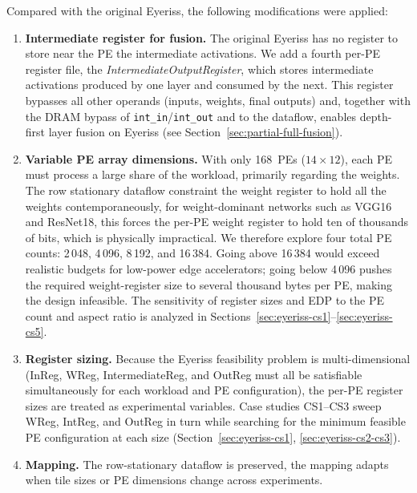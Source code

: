 Compared with the original Eyeriss, the following modifications were
applied:

\begin{enumerate}
  \item \textbf{Intermediate register for fusion.}
        The original Eyeriss has no register to store near the PE
        the intermediate activations.
        We add a fourth per-PE register file, the
        \emph{IntermediateOutputRegister}, which stores intermediate
        activations produced by one layer and consumed by the next.
        This register bypasses all other operands (inputs, weights,
        final outputs) and, together with the DRAM bypass of
        \texttt{int\_in}/\texttt{int\_out} and to the dataflow, enables depth-first
        layer fusion on Eyeriss
        (see Section~\ref{sec:partial-full-fusion}).

  \item \textbf{Variable PE array dimensions.}
        With only 168~PEs ($14 \times 12$), each PE must process a
        large share of the workload, primarily regarding the weights.
        The row stationary dataflow constraint the weight register to hold
        all the weights contemporaneously, for weight-dominant networks such
        as VGG16 and ResNet18, this forces the per-PE weight register to hold
        ten of thousands of bits, which is physically impractical.
        We therefore explore four total PE counts:
        2\,048, 4\,096, 8\,192, and 16\,384.
        Going above 16\,384 would exceed realistic budgets for
        low-power edge accelerators; going below 4\,096 pushes the
        required weight-register size to several thousand bytes per PE,
        making the design infeasible.
        The sensitivity of register sizes and EDP to the PE count and
        aspect ratio is analyzed in
        Sections~\ref{sec:eyeriss-cs1}--\ref{sec:eyeriss-cs5}.

  \item \textbf{Register sizing.}
        Because the Eyeriss feasibility problem is multi-dimensional
        (InReg, WReg, IntermediateReg, and OutReg must all be
        satisfiable simultaneously for each workload and PE
        configuration), the per-PE register sizes are treated as
        experimental variables.
        Case studies CS1--CS3 sweep WReg, IntReg, and OutReg in turn
        while searching for the minimum feasible PE configuration at
        each size (Section~\ref{sec:eyeriss-cs1}, \ref{sec:eyeriss-cs2-cs3}).

  \item \textbf{Mapping.}
        The row-stationary dataflow is preserved, the mapping adapts when tile sizes or PE
        dimensions change across experiments.
\end{enumerate}


